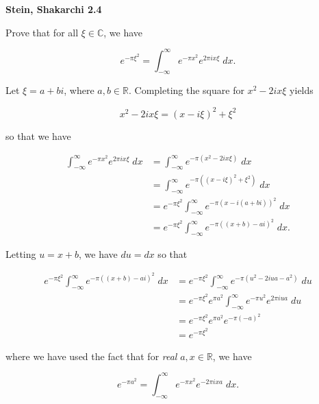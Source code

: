 \textbf{Stein, Shakarchi 2.4}

Prove that for all $\xi \in \mathbb{C}$, we have

$$
e^{-\pi \xi^2} = \int_{-\infty}^{\infty} {e^{-\pi x^2} e^{2 \pi i x \xi} \; dx}.
$$

\begin{solution}
    Let $\xi = a + bi$, where $a, b \in \mathbb{R}$. Completing the square for $x^2 - 2 i x \xi$ yields

    $$
    x^2 - 2 i x \xi = (x - i\xi)^2 + \xi^2
    $$

    so that we have

    \begin{align*}
        \int_{-\infty}^{\infty} {e^{-\pi x^2} e^{2 \pi i x \xi} \; dx} &= \int_{-\infty}^{\infty} {e^{-\pi (x^2 - 2 i x \xi)} \; dx} \\
                                                                       &= \int_{-\infty}^{\infty} {e^{-\pi \left( (x - i\xi)^2 + \xi^2 \right)} \; dx} \\
                                                                       &= e^{-\pi \xi^2}\int_{-\infty}^{\infty} {e^{-\pi \left( x - i(a + bi)\right)^2} \; dx} \\
                                                                       &= e^{-\pi \xi^2}\int_{-\infty}^{\infty} {e^{-\pi \left((x + b) - ai \right)^2} \; dx}.
    \end{align*}

    Letting $u = x + b$, we have $du = dx$ so that

    \begin{align*}
        e^{-\pi \xi^2}\int_{-\infty}^{\infty} {e^{-\pi \left((x + b) - ai \right)^2 } \; dx} 
          &=e^{-\pi \xi^2}\int_{-\infty}^{\infty} {e^{-\pi \left(u^2 - 2 i u a - a^2 \right)} \; du} \\
          &=e^{-\pi \xi^2} e^{\pi a^2} \int_{-\infty}^{\infty} {e^{-\pi u^2} e^{2 \pi i u a } \; du} \\
          &=e^{-\pi \xi^2} e^{\pi a^2} e^{-\pi (-a)^2} \\
          &=e^{-\pi \xi^2} 
    \end{align*}

    where we have used the fact that for \textit{real} $a, x \in \mathbb{R}$, we have

    $$
    e^{-\pi a^2} = \int_{-\infty}^{\infty} e^{-\pi x^2} e^{-2 \pi i x a}\; dx.
    $$

    \ \\
\end{solution}
